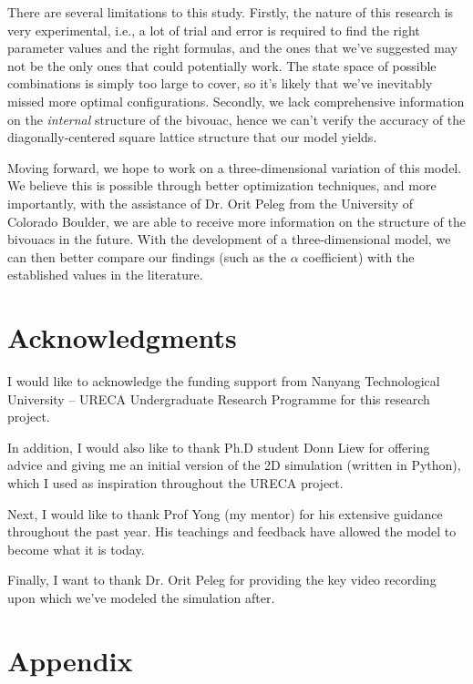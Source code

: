 \documentclass[a4paper,10pt]{article}
\begin{document}
\begin{multicols}{2}
    There are several limitations to this study. Firstly, the nature of this research is
    very experimental, i.e., a lot of trial and error is required to find the right parameter
    values and the right formulas, and the ones that we've suggested may not be the only ones that
    could potentially work. The state space of possible combinations is simply too large to cover,
    so it's likely that we've inevitably missed more optimal configurations. Secondly, we lack
    comprehensive information on the \textit{internal} structure of the bivouac, hence we can't verify
    the accuracy of the diagonally-centered square lattice structure that our model yields.

    Moving forward, we hope to work on a three-dimensional variation of this model. We believe this
    is possible through better optimization techniques, and more importantly, with the assistance
    of Dr. Orit Peleg from the University of Colorado Boulder, we are able to receive more information
    on the structure of the bivouacs in the future. With the development of a three-dimensional model,
    we can then better compare our findings (such as the $\alpha$ coefficient) with the established values
    in the literature.

    \section*{Acknowledgments}

    I would like to acknowledge the funding support from Nanyang Technological University – URECA Undergraduate Research Programme for this research project.

    In addition, I would also like to thank Ph.D student Donn Liew for offering advice and giving me an initial
    version of the 2D simulation (written in Python), which I used as inspiration throughout the URECA project.

    Next, I would like to thank Prof Yong (my mentor) for his extensive guidance throughout the past year. His
    teachings and feedback have allowed the model to become what it is today.

    Finally, I want to thank Dr. Orit Peleg for providing the key video recording upon which we've modeled the simulation after.

    \section*{Appendix}


\end{multicols}
\end{document}
